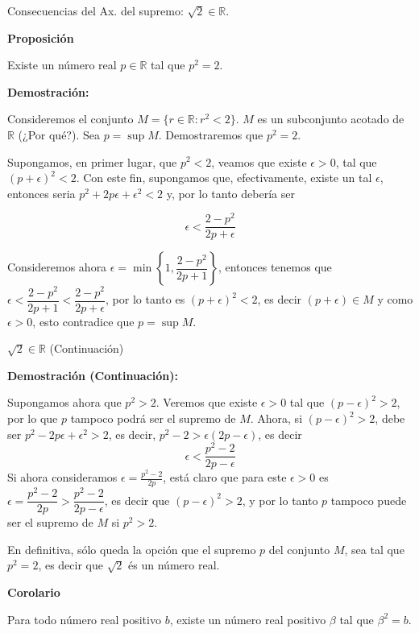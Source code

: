 \documentclass[ignorenonframetext,]{beamer}
\begin{document}
\begin{frame}{Consecuencias del Ax. del supremo:
\(\sqrt{2} \in \mathbb{R}\).}
\protect\hypertarget{consecuencias-del-ax.-del-supremo-sqrt2-in-mathbbr.}{}

 \textbf{Proposición}

Existe un número real \(p \in \mathbb{R}\) tal que \(p^2 = 2\).

\textbf{Demostración:}

Consideremos el conjunto \(M = \{r \in \mathbb{R}: r^2 <2 \}\). \(M\) es
un subconjunto acotado de \(\mathbb{R}\) (¿Por qué?). Sea
\(p = \sup M\). Demostraremos que \(p^2 =2\).

Supongamos, en primer lugar, que \(p^2<2\), veamos que existe
\(\epsilon >0\), tal que \((p+ \epsilon)^2 <2\). Con este fin,
supongamos que, efectivamente, existe un tal \(\epsilon\), entonces
seria \(p^2+2p \epsilon +{\epsilon}^2 <2\) y, por lo tanto debería ser

\[
\epsilon < \dfrac{2-p^2}{2p+\epsilon}
\]

Consideremos ahora
\(\epsilon = \min \left\{1,\dfrac{2-p^2}{2p+1} \right\}\), entonces
tenemos que
\(\epsilon < \dfrac{2-p^2}{2p+1} < \dfrac{2-p^2}{2p+\epsilon}\), por lo
tanto es \((p+\epsilon)^2 < 2\), es decir \((p+\epsilon) \in M\) y como
\(\epsilon >0\), esto contradice que \(p= \sup M\).

\end{frame}

\begin{frame}{\(\sqrt{2} \in \mathbb{R}\) (Continuación)}
\protect\hypertarget{sqrt2-in-mathbbr-continuaciuxf3n}{}

\textbf{Demostración (Continuación):}

Supongamos ahora que \(p^2>2\). Veremos que existe \(\epsilon >0\) tal
que \((p-\epsilon)^2 >2\), por lo que \(p\) tampoco podrá ser el supremo
de \(M\). Ahora, si \((p-\epsilon)^2 >2\), debe ser
\(p^2-2p\epsilon+\epsilon^2>2\), es decir,
\(p^2-2 > \epsilon(2p -\epsilon)\), es decir \[
\epsilon < \dfrac{p^2-2}{2p-\epsilon}
\] Si ahora consideramos \(\epsilon = \frac{p^2 -2}{2p}\), está claro
que para este \(\epsilon >0\) es
\(\epsilon = \dfrac{p^2 -2}{2p}> \dfrac{p^2-2}{2p-\epsilon}\), es decir
que \((p-\epsilon)^2 >2\), y por lo tanto \(p\) tampoco puede ser el
supremo de \(M\) si \(p^2 >2\).

En definitiva, sólo queda la opción que el supremo \(p\) del conjunto
\(M\), sea tal que \(p^2=2\), es decir que \(\sqrt{2}\) és un número
real.

\textbf{Corolario}

Para todo número real positivo \(b\), existe un número real positivo
\(\beta\) tal que \(\beta^2 =b\).

\end{frame}
\end{document}
